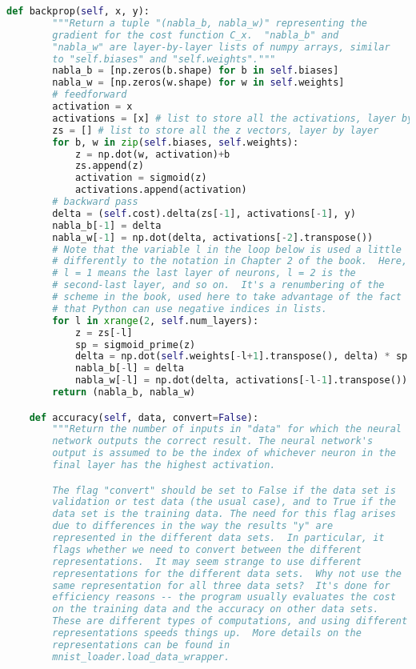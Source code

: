 \begin{fullwidth}
\begin{lstlisting}[caption={network2.py (Python 2.7)},label={lst:network2.py}, language=Python]
    def backprop(self, x, y):
        """Return a tuple "(nabla_b, nabla_w)" representing the
        gradient for the cost function C_x.  "nabla_b" and
        "nabla_w" are layer-by-layer lists of numpy arrays, similar
        to "self.biases" and "self.weights"."""
        nabla_b = [np.zeros(b.shape) for b in self.biases]
        nabla_w = [np.zeros(w.shape) for w in self.weights]
        # feedforward
        activation = x
        activations = [x] # list to store all the activations, layer by layer
        zs = [] # list to store all the z vectors, layer by layer
        for b, w in zip(self.biases, self.weights):
            z = np.dot(w, activation)+b
            zs.append(z)
            activation = sigmoid(z)
            activations.append(activation)
        # backward pass
        delta = (self.cost).delta(zs[-1], activations[-1], y)
        nabla_b[-1] = delta
        nabla_w[-1] = np.dot(delta, activations[-2].transpose())
        # Note that the variable l in the loop below is used a little
        # differently to the notation in Chapter 2 of the book.  Here,
        # l = 1 means the last layer of neurons, l = 2 is the
        # second-last layer, and so on.  It's a renumbering of the
        # scheme in the book, used here to take advantage of the fact
        # that Python can use negative indices in lists.
        for l in xrange(2, self.num_layers):
            z = zs[-l]
            sp = sigmoid_prime(z)
            delta = np.dot(self.weights[-l+1].transpose(), delta) * sp
            nabla_b[-l] = delta
            nabla_w[-l] = np.dot(delta, activations[-l-1].transpose())
        return (nabla_b, nabla_w)

    def accuracy(self, data, convert=False):
        """Return the number of inputs in "data" for which the neural
        network outputs the correct result. The neural network's
        output is assumed to be the index of whichever neuron in the
        final layer has the highest activation.

        The flag "convert" should be set to False if the data set is
        validation or test data (the usual case), and to True if the
        data set is the training data. The need for this flag arises
        due to differences in the way the results "y" are
        represented in the different data sets.  In particular, it
        flags whether we need to convert between the different
        representations.  It may seem strange to use different
        representations for the different data sets.  Why not use the
        same representation for all three data sets?  It's done for
        efficiency reasons -- the program usually evaluates the cost
        on the training data and the accuracy on other data sets.
        These are different types of computations, and using different
        representations speeds things up.  More details on the
        representations can be found in
        mnist_loader.load_data_wrapper.


\end{lstlisting}
\end{fullwidth}
